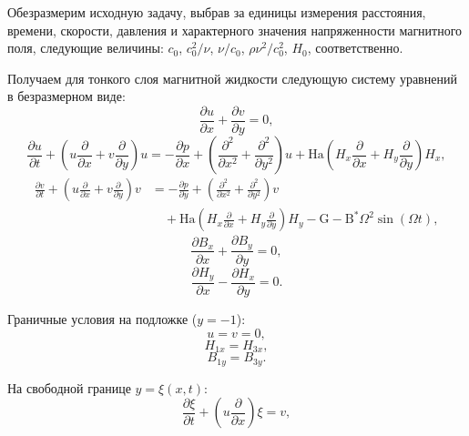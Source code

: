 \documentclass[12pt,a4paper]{article}
\begin{document}
Обезразмерим исходную задачу, выбрав за единицы измерения
расстояния, времени, скорости, давления и характерного значения
напряженности магнитного поля, следующие величины: $c_0$, $c_0^2/\nu$, $\nu/ c_0$,
$\rho\nu^2/c_0^{2}$, $H_0$, соответственно.


Получаем для тонкого слоя магнитной жидкости следующую систему
уравнений в безразмерном виде:
\begin{equation}\label{eq:div_ferro}
\frac{\partial u}{\partial x}
+
\frac{\partial v}{\partial y}
=0,
\end{equation}
\begin{equation}
\frac{\partial u}{\partial t}
+
\left(
u\frac{\partial}{\partial x}
+
v\frac{\partial}{\partial y}
\right)u
=
-\frac{\partial p}{\partial x}
+
\left(
\frac{\partial^2}{\partial x^2}
+
\frac{\partial^2}{\partial y^2}
\right)u
+
\mathrm{Ha}
\left(
H_x\frac{\partial}{\partial x}
+
H_y\frac{\partial}{\partial y}
\right)H_x,
\end{equation}
\begin{equation}
	\begin{aligned}
		\frac{\partial v}{\partial t}
		+
		\left(
		u\frac{\partial}{\partial x}
		+
		v\frac{\partial}{\partial y}
		\right)v
		&=
		-\frac{\partial p}{\partial y}
		+
		\left(
		\frac{\partial^2}{\partial x^2}
		+
		\frac{\partial^2}{\partial y^2}
		\right)v
		\\
		&\quad
		+ \mathrm{Ha}
		\left(
		H_x\frac{\partial}{\partial x}
		+
		H_y\frac{\partial}{\partial y}
		\right)H_y
		- \mathrm{G}
		- \mathrm{B}^{*}\Omega^2\sin(\Omega t),
	\end{aligned}
\end{equation}
\begin{equation}
\frac{\partial B_x}{\partial x}
+
\frac{\partial B_y}{\partial y}
=0,
\end{equation}
\begin{equation}
\frac{\partial H_y}{\partial x}
-
\frac{\partial H_x}{\partial y}
=0.
\end{equation}

Граничные условия на подложке (\(y=-1\)):
\begin{equation}
u=v=0,
\end{equation}
\begin{equation}
H_{1x}=H_{3x},
\end{equation}
\begin{equation}
B_{1y}=B_{3y}.
\end{equation}

На свободной границе \(y=\xi(x,t)\):
\begin{equation}
\frac{\partial \xi}{\partial t}
+
\left(
u\frac{\partial}{\partial x}
\right)\xi
=
v,
\end{equation}
\end{document}
